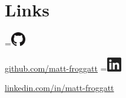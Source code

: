 \documentclass[]{deedy-resume-openfont}
\newcommand*{\vcenteredhbox}[1]{\begingroup
\setbox0=\hbox{#1}\parbox{\wd0}{\box0}\endgroup}
\begin{document}
\begin{minipage}[t]{0.95\textwidth}

\section{Links}
\hspace{10pt}
\vcenteredhbox{\includegraphics[height = 18pt]{Icons/GitHub-Mark-64px.png}}        \space\href{https://github.com/matt-froggatt}{github.com/matt-froggatt}
\hspace{5pt}
\vcenteredhbox{\includegraphics[height = 18pt]{Icons/black-white-linkedin.jpg}} \space\href{https://www.linkedin.com/in/matt-froggatt/}{linkedin.com/in/matt-froggatt}    

\end{minipage}
\end{document}
